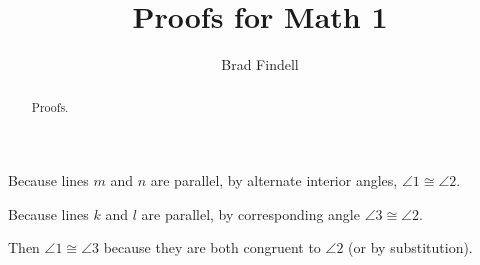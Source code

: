 \documentclass[nooutcomes]{ximera}
\title{Proofs for Math 1}
\author{Brad Findell}
\begin{document}
\begin{abstract}
Proofs. 
\end{abstract}
\maketitle


\begin{problem}

Because lines $m$ and $n$ are parallel, by alternate interior angles, 
$\angle 1 \cong \angle 2$.

Because lines $k$ and $l$ are parallel, by corresponding angle  
$\angle 3 \cong \angle 2$.  

Then $\angle 1 \cong \angle 3$ because they are both congruent 
to $\angle 2$ (or by substitution). 
\end{problem}
\end{document}
